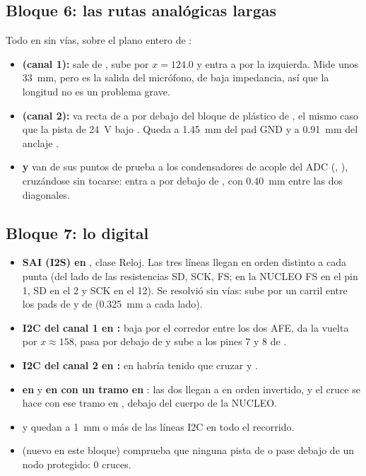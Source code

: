 \subsection{Bloque 6: las rutas analógicas largas}

Todo en  sin vías, sobre el plano entero de :
\begin{itemize}
  \item \textbf{ (canal 1):} sale de , sube por $x = \num{124.0}$ y entra a  por la
  izquierda. Mide unos \SI{33}{\milli\meter}, pero es la salida del micrófono, de baja impedancia, así que la longitud
  no es un problema grave.
  \item \textbf{ (canal 2):} va recta de  a  por debajo del bloque de plástico de
  , el mismo caso que la pista de \SI{24}{\volt} bajo . Queda a \SI{1.45}{\milli\meter} del pad GND
   y a \SI{0.91}{\milli\meter} del anclaje .
  \item \textbf{ y } van de sus puntos de prueba a los condensadores de acople del ADC
  (, ), cruzándose sin tocarse:  entra a  por debajo de , con
  \SI{0.40}{\milli\meter} entre las dos diagonales.
\end{itemize}

\subsection{Bloque 7: lo digital}

\begin{itemize}
  \item \textbf{SAI (I2S) en }, clase Reloj. Las tres líneas llegan en orden distinto a cada punta (del lado
  de las resistencias SD, SCK, FS; en la NUCLEO FS en el pin 1, SD en el 2 y SCK en el 12). Se resolvió sin vías:
   sube por un carril entre los pads de  y de  (\SI{0.325}{\milli\meter} a cada lado).
  \item \textbf{I2C del canal 1 en :} baja por el corredor entre los dos AFE, da la vuelta por
  $x \approx \num{158}$, pasa por debajo de  y sube a los pines 7 y 8 de .
  \item \textbf{I2C del canal 2 en :} en  habría tenido que cruzar  y
  .
  \item \textbf{ en } y \textbf{ en  con un tramo en }:
  las dos llegan a  en orden invertido, y el cruce se hace con ese tramo en , debajo del cuerpo de
  la NUCLEO.
  \item {} y  quedan a \SI{1}{\milli\meter} o más de las líneas I2C en todo el recorrido.
  \item {} (nuevo en este bloque) comprueba que ninguna pista de  o 
  pase debajo de un nodo protegido: 0 cruces.
\end{itemize}

